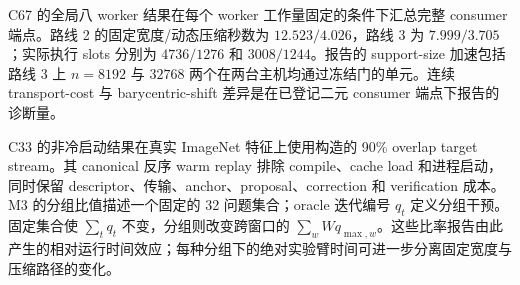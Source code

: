 C67 的全局八 worker 结果在每个 worker 工作量固定的条件下汇总完整 consumer 端点。路线 2 的固定宽度/动态压缩秒数为 $12.523/4.026$，路线 3 为 $7.999/3.705$；实际执行 slots 分别为 $4736/1276$ 和 $3008/1244$。报告的 support-size 加速包括路线 3 上 $n=8192$ 与 $32768$ 两个在两台主机均通过冻结门的单元。连续 transport-cost 与 barycentric-shift 差异是在已登记二元 consumer 端点下报告的诊断量。

C33 的非冷启动结果在真实 ImageNet 特征上使用构造的 90\% overlap target stream。其 canonical 反序 warm replay 排除 compile、cache load 和进程启动，同时保留 descriptor、传输、anchor、proposal、correction 和 verification 成本。M3 的分组比值描述一个固定的 32 问题集合；oracle 迭代编号 $q_t$ 定义分组干预。固定集合使 $\sum_t q_t$ 不变，分组则改变跨窗口的 $\sum_w W q_{\max,w}$。这些比率报告由此产生的相对运行时间效应；每种分组下的绝对实验臂时间可进一步分离固定宽度与压缩路径的变化。
